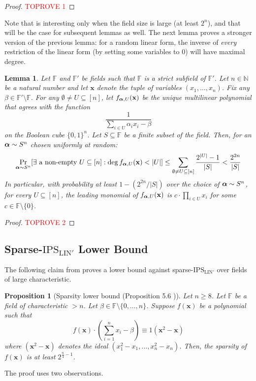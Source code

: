 \documentclass[11pt]{article}
\newtheorem{lemma}[theorem]{Lemma}
\newtheorem{proposition}[theorem]{Proposition}
\newcommand{\Boo}{\{0,1 \}}
\newcommand{\F}{\mathbb{F}}
\newcommand{\IPSLINp}{\mathrm{IPS}_{\mathrm{LIN}'}}
\begin{document}
\begin{proof}\textcolor{red}{TOPROVE 1}\end{proof}



Note that  is interesting only when the field size is large (at least $2^n$), and that will be the case for subsequent lemmas as well. The next lemma proves a stronger version of the previous lemma: for a random linear form, the inverse of \emph{every} restriction of the linear form (by setting some variables to 0) will have maximal degree.
\begin{lemma}\label{lem: deg lower bound union bound}
    Let $\F$ and $\F'$ be fields such that $\F$ is a strict subfield of $\F'$. Let $n\in \mathbb{N}$ be a natural number and let $\mathbf{x}$ denote the tuple of variables $(x_1, \dots, x_n)$. Fix any $\beta \in \F'\setminus \F$. For any $\emptyset \neq U \subseteq [n]$, let $f_{\boldsymbol{\alpha},U}(\mathbf{x})$ be the unique multilinear polynomial that agrees with the function $$\frac{1}{\sum_{i\in U}{\alpha_ix_i}-\beta}$$ on the Boolean cube $\Boo^n$.
    Let $S \subseteq \F$ be a finite subset of the field.
    Then, for an $\boldsymbol{\alpha} \sim S^n$ chosen uniformly at random: $$\Pr_{\boldsymbol{\alpha} \sim S^n}[\exists \text{ a non-empty } U\subseteq [n]:\deg{f_{\ensuremath{\boldsymbol{\alpha}},U}(\mathbf{x})} < |U|] \leq \sum_{\emptyset \neq U\subseteq [n]}\frac{2^{|U|}-1}{|S|} < \frac{2^{2n}}{|S|}$$
    In particular, with probability at least $1-(2^{2n}/|S|)$ over the choice of $\boldsymbol{\alpha} \sim S^n$, for every $U \subseteq [n]$, the leading monomial of $f_{\boldsymbol{\alpha},U}(\mathbf{x})$ is $c\cdot\prod_{i\in U}x_i$ for some $c\in\F\setminus\{0\}$. 
\end{lemma}
\begin{proof}\textcolor{red}{TOPROVE 2}\end{proof}

\subsection{Sparse-$\IPSLINp$ Lower Bound}
The following claim from \cite{FSTW21} proves a lower bound against sparse-$\IPSLINp$ over fields of large characteristic. 
\begin{proposition}[Sparsity lower bound (Proposition 5.6 \cite{FSTW21})]
    Let $n \geq 8$. Let $\F$ be a field of characteristic $> n$. Let $\beta \in \F\setminus\{0,\dots, n\}$. Suppose $f(\mathbf{x})$ be a polynomial such that $$f(\mathbf{x}) \cdot \left (\sum_{i=1}^{n}{x_i} - \beta \right) \equiv 1 \left({\mathbf{x}^2 - \mathbf{x}} \right )$$ where $\left({\mathbf{x}^2 - \mathbf{x}} \right)$ denotes the ideal $(x_1^2-x_1, \dots, x_n^2 - x_n)$.
    Then, the sparsity of $f(\mathbf{x})$ is at least $2^{\frac{n}{4} -  1}$.
\end{proposition}
The proof uses two observations.
\end{document}
